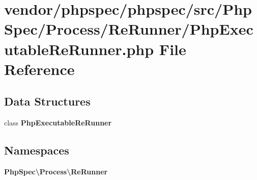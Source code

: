 \section{vendor/phpspec/phpspec/src/\+Php\+Spec/\+Process/\+Re\+Runner/\+Php\+Executable\+Re\+Runner.php File Reference}
\label{_php_executable_re_runner_8php}
\subsection*{Data Structures}
\begin{DoxyCompactItemize}
\item 
class {\bf Php\+Executable\+Re\+Runner}
\end{DoxyCompactItemize}
\subsection*{Namespaces}
\begin{DoxyCompactItemize}
\item 
 {\bf Php\+Spec\textbackslash{}\+Process\textbackslash{}\+Re\+Runner}
\end{DoxyCompactItemize}
